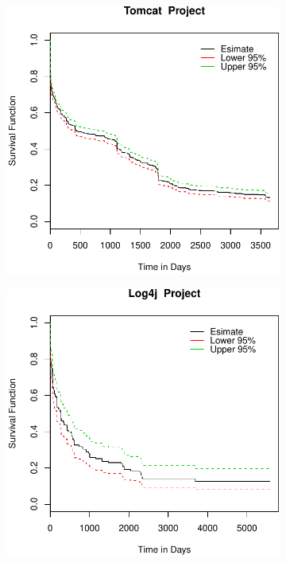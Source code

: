 \begin{figure}[t]
\begin{subfigure}[b]{0.195\textwidth}
		\label{fig:removal_comparison_gerrit_survival} 
	\end{subfigure}
	\begin{subfigure}[b]{0.195\textwidth}
		\includegraphics[width=\textwidth]{figures/Survival/tomcat.pdf}
		\label{fig:removal_comparison_hadoop_survival} 
	\end{subfigure}
	\begin{subfigure}[b]{0.195\textwidth}
		\includegraphics[width=\textwidth]{figures/Survival/log4j.pdf}

\end{subfigure}
\end{figure}
